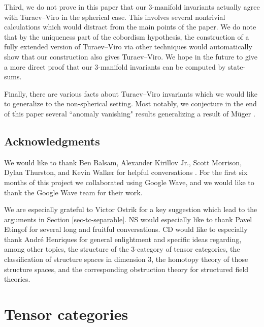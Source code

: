 \documentclass{amsart}
\begin{document}
Third, we do not prove in this paper that our $3$-manifold invariants actually agree with Turaev--Viro in the spherical case.  This involves several nontrivial calculations which would distract from the main points of the paper.  We do note that by the uniqueness part of the cobordism hypothesis, the construction of a fully extended version of Turaev--Viro via other techniques would automatically show that our construction also gives Turaev--Viro.  We hope in the future to give a more direct proof that our $3$-manifold invariants can be computed by state-sums.

Finally, there are various facts about Turaev--Viro invariants which we would like to generalize to the non-spherical setting.  Most notably, we conjecture in the end of this paper several ``anomaly vanishing" results generalizing a result of M\"uger \cite{MR1966525}. 

\subsection*{Acknowledgments}
We would like to thank Ben Balsam, Alexander Kirillov Jr., Scott Morrison, Dylan Thurston, and Kevin Walker for helpful conversations .   For the first six months of this project we collaborated using Google Wave, and we would like to thank the Google Wave team for their work.

We are especially grateful to Victor Ostrik for a key suggestion which lead to the arguments in Section \ref{sec-tc-separable}.  NS would especially like to thank Pavel Etingof for several long and fruitful conversations.  CD would like to especially thank Andr\'e Henriques for general enlightment and specific ideas regarding, among other topics, the structure of the 3-category of tensor categories, the classification of structure spaces in dimension 3,  the homotopy theory of those structure spaces, and the corresponding obstruction theory for structured field theories.



\section{Tensor categories} \label{sec-tc}

\end{document}
